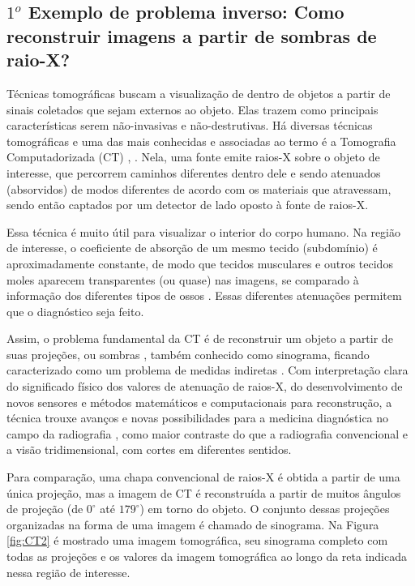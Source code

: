 \subsection{$1^o$ Exemplo de problema inverso: Como reconstruir imagens a partir de sombras de raio-X?}

Técnicas tomográficas buscam a visualização de dentro de objetos a partir de sinais coletados que sejam externos ao objeto. Elas trazem como principais características serem não-invasivas e não-destrutivas. Há diversas técnicas tomográficas e uma das mais conhecidas e associadas ao termo é a Tomografia Computadorizada (CT) \cite{Natterer2001}, \cite[págs. 21-32]{Mueller2012}. Nela, uma fonte emite raios-X sobre o objeto de interesse, que percorrem caminhos diferentes dentro dele e sendo atenuados (absorvidos) de modos diferentes de acordo com os materiais que atravessam, sendo então captados por um detector de lado oposto à fonte de raios-X.  

Essa técnica é muito útil para visualizar o interior do corpo humano. Na região de interesse, o  coeficiente de absorção de um mesmo tecido (subdomínio) é aproximadamente constante, de modo que tecidos musculares e outros tecidos moles aparecem transparentes (ou quase) nas imagens, se comparado à informação dos diferentes tipos de ossos \cite[pág. 237]{kaipio2005statistical}. Essas diferentes atenuações  permitem que o diagnóstico seja feito. 

Assim, o problema fundamental da CT é de reconstruir um objeto a partir de suas projeções, ou sombras \cite{buzug2008computed}, também conhecido como sinograma, ficando caracterizado como um problema de medidas indiretas \cite[pag. 5]{Mueller2012}. Com interpretação clara do significado físico dos valores de atenuação de raios-X, do desenvolvimento de novos sensores e métodos matemáticos e computacionais para reconstrução, a técnica trouxe avanços e novas possibilidades para a medicina diagnóstica no campo da radiografia \cite{buzug2008computed}, como maior contraste do que a radiografia convencional e a visão tridimensional, com cortes em diferentes sentidos. 

Para comparação, uma chapa convencional de raios-X é obtida a partir de uma única projeção, mas a imagem de CT é reconstruída a partir de muitos ângulos de projeção (de $0^{\circ}$ até $179^{\circ}$) em torno do objeto. O conjunto dessas projeções organizadas na forma de uma imagem é chamado de sinograma. Na Figura \ref{fig:CT2} é mostrado uma imagem tomográfica, seu sinograma completo com todas as projeções e os valores da imagem tomográfica ao longo da reta indicada nessa região de interesse. 


